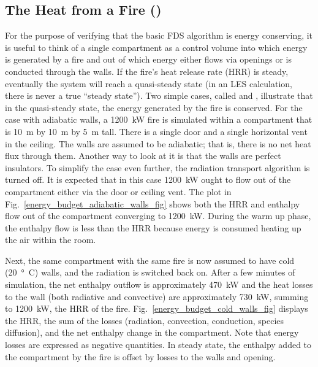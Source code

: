 \documentclass[11pt]{book}
\begin{document}
\subsection{The Heat from a Fire (\texorpdfstring{}{energy\_budget})}
\label{energy_budget_walls}
\label{energy_budget_adiabatic_walls}
\label{energy_budget_cold_walls}

For the purpose of verifying that the basic FDS algorithm is energy conserving, it is useful to think of a single compartment as a control volume into which energy is generated by a fire and out of which energy either flows via openings or is conducted through the walls. If the fire's heat release rate (HRR) is steady, eventually the system will reach a quasi-steady state (in an LES calculation, there is never a true ``steady state''). Two simple cases, called  and , illustrate that in the quasi-steady state, the energy generated by the fire is conserved. For the case with adiabatic walls, a 1200~kW fire is simulated within a compartment that is 10~m by 10~m by 5~m tall. There is a single door and a single horizontal vent in the ceiling. The walls are assumed to be adiabatic; that is, there is no net heat flux through them. Another way to look at it is that the walls are perfect insulators. To simplify the case even further, the radiation transport algorithm is turned off. It is expected that in this case 1200~kW ought to flow out of the compartment either via the door or ceiling vent. The plot in Fig.~\ref{energy_budget_adiabatic_walls_fig} shows both the HRR and enthalpy flow out of the compartment converging to 1200~kW. During the warm up phase, the enthalpy flow is less than the HRR because energy is consumed heating up the air within the room.

Next, the same compartment with the same fire is now assumed to have cold (20~\si{\degree C}) walls, and the radiation is switched back on. After a few minutes of simulation, the net enthalpy outflow is approximately 470~kW and the heat losses to the wall (both radiative and convective) are approximately 730~kW, summing to 1200~kW, the HRR of the fire. Fig.~\ref{energy_budget_cold_walls_fig} displays the HRR, the sum of the losses (radiation, convection, conduction, species diffusion), and the net enthalpy change in the compartment. Note that energy losses are expressed as negative quantities. In steady state, the enthalpy added to the compartment by the fire is offset by losses to the walls and opening.
\end{document}
